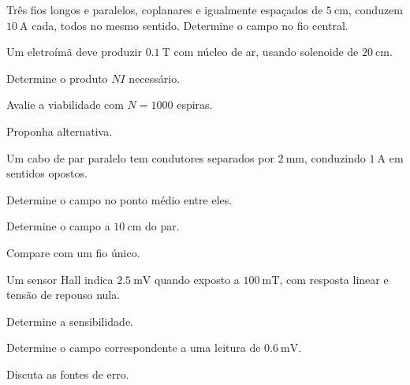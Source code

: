 \begin{questao}[3]{}

Três fios longos e paralelos, coplanares e igualmente espaçados de
$\SI{5}{\centi\meter}$, conduzem $\SI{10}{\ampere}$ cada, todos no mesmo
sentido. Determine o campo no fio central.


\end{questao}
\begin{questao}[3]{}

Um eletroímã deve produzir $\SI{0.1}{\tesla}$ com núcleo de ar, usando
solenoide de $\SI{20}{\centi\meter}$.
\begin{itensq}
\item Determine o produto $NI$ necessário.
\item Avalie a viabilidade com $N=1000$ espiras.
\item Proponha alternativa.
\end{itensq}


\end{questao}
\begin{questao}[3]{}

Um cabo de par paralelo tem condutores separados por $\SI{2}{\milli\meter}$,
conduzindo $\SI{1}{\ampere}$ em sentidos opostos.
\begin{itensq}
\item Determine o campo no ponto médio entre eles.
\item Determine o campo a $\SI{10}{\centi\meter}$ do par.
\item Compare com um fio único.
\end{itensq}


\end{questao}
\begin{questao}[3]{}

Um sensor Hall indica $\SI{2.5}{\milli\volt}$ quando exposto a
$\SI{100}{\milli\tesla}$, com resposta linear e tensão de repouso nula.
\begin{itensq}
\item Determine a sensibilidade.
\item Determine o campo correspondente a uma leitura de
      $\SI{0.6}{\milli\volt}$.
\item Discuta as fontes de erro.
\end{itensq}


\end{questao}

